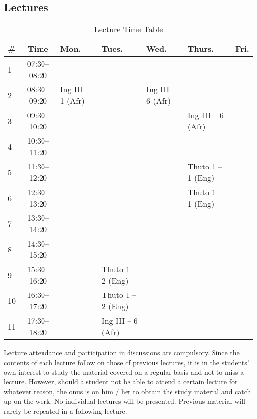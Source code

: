     \subsection{Lectures}
        \begin{table}[!h]
            \begin{center}
             \begin{tabular}{|l|c|p{2.1cm}|p{2.1cm}|p{2.1cm}|p{2.1cm}|p{1.5cm}|}
                 \hline
                 {\bf \#} & {\bf Time} & {\bf Mon.} & {\bf Tues.} & {\bf Wed.} &
                 {\bf Thurs.} & {\bf Fri.} \\
                 \hline
                 1  & 07:30--08:20 &  &  &  &  & \\ \hline
                 2  & 08:30--09:20 &  Ing III -- 1 (Afr)  &  & Ing III -- 6 (Afr) &  & \\ \hline
                 3  & 09:30--10:20 &  &  &  & Ing III -- 6 (Afr) & \\ \hline
                 4  & 10:30--11:20 &  &  &  &  & \\ \hline
                 5  & 11:30--12:20 &  &  &  & Thuto 1 -- 1 (Eng) & \\ \hline
                 6  & 12:30--13:20 &  &  &  & Thuto 1 -- 1 (Eng) & \\ \hline
                 7  & 13:30--14:20 &  &  &  &  & \\ \hline
                 8  & 14:30--15:20 &  &  &  &  & \\ \hline
                 9  & 15:30--16:20 &  & Thuto 1 -- 2 (Eng) &  &  & \\ \hline
                 10 & 16:30--17:20 &  & Thuto 1 -- 2 (Eng) &  &  & \\ \hline
                 11 & 17:30--18:20 &  & Ing III -- 6 (Afr) &  &  & \\
                 \hline
             \end{tabular}
             \caption{Lecture Time Table}
            \end{center}
        \end{table}
        
        Lecture attendance and participation in discussions are compulsory. 
        Since the contents of each lecture follow on those of previous lectures, 
        it is in the students’ own interest to study the material covered on a regular
        basis and not to miss a lecture. However, should a student not be able to
        attend a certain lecture for whatever reason, the onus is on him / her to
        obtain the study material and catch up on the work. No individual lectures
        will be presented. Previous material will rarely be repeated in a following 
        lecture.
        
